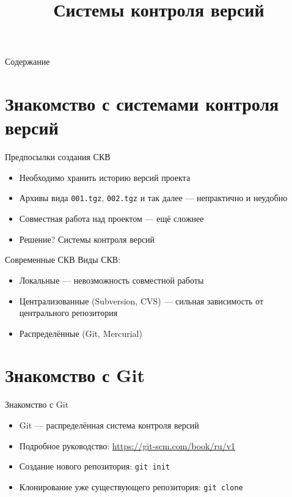 \documentclass{beamer}
\title{Системы контроля версий}
\date{}
\begin{document}
\begin{frame}
	\maketitle
\end{frame}

\begin{frame}{Содержание}
	\tableofcontents
\end{frame}

\section{Знакомство с системами контроля версий}

\begin{frame}{Предпосылки создания СКВ}
	\begin{itemize}
		\item{Необходимо хранить историю версий проекта}\pause
		\item{Архивы вида \texttt{001.tgz}, \texttt{002.tgz} и так далее --- непрактично и неудобно}\pause
		\item{Совместная работа над проектом --- ещё сложнее}\pause
		\item{Решение? Системы контроля версий}
	\end{itemize}	
\end{frame}

\begin{frame}{Современные СКВ}
	Виды СКВ:\pause
	\begin{itemize}
		\item{Локальные --- невозможность совместной работы}\pause
		\item{Централизованные (Subversion, CVS) --- сильная зависимость от центрального репозитория}\pause
		\item{Распределённые (Git, Mercurial)}
	\end{itemize}
\end{frame}

\section{Знакомство с Git}

\begin{frame}{Знакомство с Git}
	\begin{itemize}
		\item{Git --- распределённая система контроля версий}\pause
		\item{Подробное руководство: {\color{blue} \url{https://git-scm.com/book/ru/v1}}}\pause
		\item{Создание нового репозитория: \texttt{git~init}}\pause
		\item{Клонирование уже существующего репозитория: \texttt{git~clone}}
	\end{itemize}
\end{frame}
\end{document}
